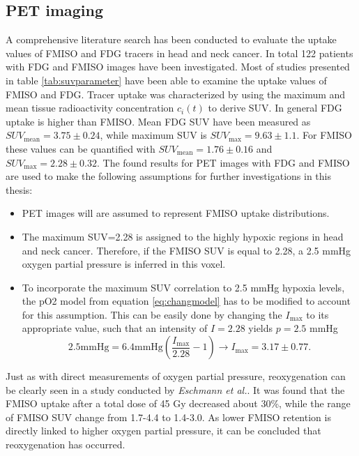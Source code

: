 \subsection{PET imaging}\label{chap:petimaging}
A comprehensive literature search has been conducted to evaluate the uptake values of FMISO and FDG tracers in head and neck cancer. In total 122 patients with FDG and FMISO images have been investigated. Most of studies presented in table \ref{tab:suvparameter} have been able to examine the uptake values of FMISO and FDG. Tracer uptake was characterized by using the maximum and mean tissue radioactivity concentration $c_i(t)$ to derive SUV. In general FDG uptake is higher than FMISO. Mean FDG SUV have been measured as $SUV_\mathrm{mean}=3.75 \pm 0.24$, while maximum SUV is  $SUV_\mathrm{max}=9.63 \pm 1.1$. For FMISO these values can be quantified with $SUV_\mathrm{mean}=1.76 \pm 0.16$ and $SUV_\mathrm{max}=2.28 \pm 0.32$. The found results for PET images with FDG and FMISO are used to make the following assumptions for further investigations in this thesis:
\begin{itemize}
\item PET images will are assumed to represent FMISO uptake distributions.
\item The maximum SUV=2.28 is assigned to the highly hypoxic regions in head and neck cancer. Therefore, if the FMISO SUV is equal to 2.28, a 2.5 mmHg oxygen partial pressure is inferred in this voxel.
\item To incorporate the maximum SUV correlation to 2.5 mmHg hypoxia levels, the pO2 model from equation \ref{eq:changmodel} has to be modified to account for this assumption. This can be easily done by changing the $I_\mathrm{max}$ to its  appropriate value, such that an intensity of $I=2.28$ yields $p=2.5$ mmHg
\begin{equation}
2.5\mathrm{mmHg} = 6.4\mathrm{mmHg}\left(\frac{I_\mathrm{max}}{2.28}-1\right) \rightarrow I_\mathrm{max} = 3.17 \pm 0.77.
\end{equation}
\end{itemize}
Just as with direct measurements of oxygen partial pressure, reoxygenation can be clearly seen in a study conducted by \textit{Eschmann et al.}\cite{pmid17543402}. It was found that the FMISO uptake after a total dose of 45 Gy decreased about 30\%, while the range of FMISO SUV change from 1.7-4.4 to 1.4-3.0. As lower FMISO retention is directly linked to higher oxygen partial pressure, it can be concluded that reoxygenation has occurred.

